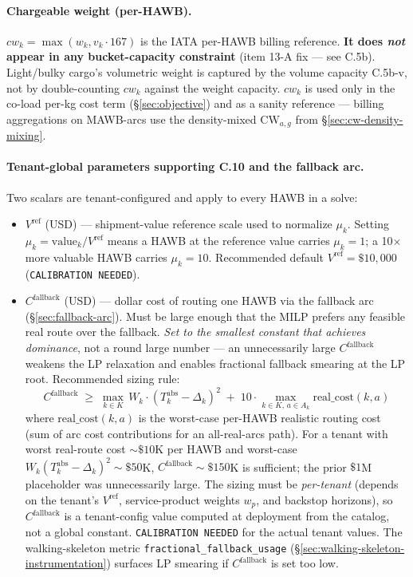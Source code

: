 \documentclass[11pt,a4paper]{article}
\theoremstyle{definition}
\begin{document}
\paragraph{Chargeable weight (per-HAWB).}
$cw_k = \max(w_k, v_k \cdot 167)$ is the IATA per-HAWB billing reference.
\textbf{It does \emph{not} appear in any bucket-capacity constraint} (item 13-A
fix --- see C.5b). Light/bulky cargo's volumetric weight is captured by the
volume capacity C.5b-v, not by double-counting $cw_k$ against the weight
capacity. $cw_k$ is used only in the co-load per-kg cost term (\S\ref{sec:objective})
and as a sanity reference --- billing aggregations on MAWB-arcs use the
density-mixed $\text{CW}_{a,g}$ from \S\ref{sec:cw-density-mixing}.

\paragraph{Tenant-global parameters supporting C.10 and the fallback arc.}
Two scalars are tenant-configured and apply to every HAWB in a solve:
\begin{itemize}[noitemsep]
  \item $V^{\text{ref}}$ (USD) --- shipment-value reference scale used to
        normalize $\mu_k$. Setting $\mu_k = \text{value}_k / V^{\text{ref}}$
        means a HAWB at the reference value carries $\mu_k = 1$; a 10$\times$
        more valuable HAWB carries $\mu_k = 10$. Recommended default
        $V^{\text{ref}} = \$10{,}000$ (\texttt{CALIBRATION NEEDED}).
  \item $C^{\text{fallback}}$ (USD) --- dollar cost of routing one HAWB via
        the fallback arc (\S\ref{sec:fallback-arc}). Must be large enough
        that the MILP prefers any feasible real route over the fallback.
        \emph{Set to the smallest constant that achieves dominance}, not a
        round large number --- an unnecessarily large $C^{\text{fallback}}$
        weakens the LP relaxation and enables fractional fallback smearing
        at the LP root. Recommended sizing rule:
        \[
          C^{\text{fallback}} \;\geq\; \max_{k \in K}\, W_k \cdot
          (T_k^{\text{abs}} - \Delta_k)^2 \;+\; 10 \cdot \max_{k \in K,\, a \in A_k}
          \text{real\_cost}(k, a)
        \]
        where $\text{real\_cost}(k, a)$ is the worst-case per-HAWB
        realistic routing cost (sum of arc cost contributions for an
        all-real-arcs path). For a tenant with worst real-route cost
        $\sim \$10$K per HAWB and worst-case $W_k (T_k^{\text{abs}} -
        \Delta_k)^2 \sim \$50$K, $C^{\text{fallback}} \sim \$150$K is
        sufficient; the prior $\$1$M placeholder was unnecessarily
        large. The sizing must be \emph{per-tenant} (depends on the
        tenant's $V^{\text{ref}}$, service-product weights $w_p$, and
        backstop horizons), so $C^{\text{fallback}}$ is a tenant-config
        value computed at deployment from the catalog, not a global
        constant. \texttt{CALIBRATION NEEDED} for the actual tenant
        values. The walking-skeleton metric
        \texttt{fractional\_fallback\_usage} (\S\ref{sec:walking-skeleton-instrumentation})
        surfaces LP smearing if $C^{\text{fallback}}$ is set too low.
\end{itemize}
\end{document}
